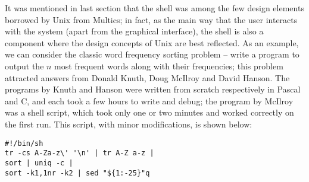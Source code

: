 It was mentioned in last section that the shell was among the few design
elements borrowed by Unix from Multics; in fact, as the main way that the user
interacts with the system (apart from the graphical
interface), the shell is also a component where the design concepts of Unix
are best reflected.  As an example, we can consider the classic word frequency
sorting problem -- write a program to output the $n$
most frequent words along with their frequencies; this problem attracted
answers from Donald Knuth, Doug McIlroy and David Hanson.  The programs by
Knuth and Hanson were written from scratch respectively in Pascal and C, and
each took a few hours to write and debug; the program by McIlroy was a shell
script, which took only one or two minutes and worked correctly on the
first run.  This script, with minor modifications, is shown below:
\begin{wquoting}
\begin{Verbatim}
#!/bin/sh
tr -cs A-Za-z\' '\n' | tr A-Z a-z |
sort | uniq -c |
sort -k1,1nr -k2 | sed "${1:-25}"q
\end{Verbatim}
\end{wquoting}

